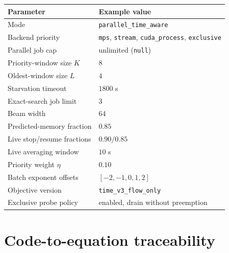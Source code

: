 \documentclass[11pt]{article}
\newcommand{\code}[1]{\textcolor{codeblue}{\texttt{#1}}}
\begin{document}
\begin{center}
\begin{tabular}{@{}ll@{}}
\toprule
Parameter & Example value \\
\midrule
Mode & \code{parallel\_time\_aware} \\
Backend priority & \code{mps}, \code{stream}, \code{cuda\_process}, \code{exclusive} \\
Parallel job cap & unlimited (\code{null}) \\
Priority-window size $K$ & $8$ \\
Oldest-window size $L$ & $4$ \\
Starvation timeout & $1800$ s \\
Exact-search job limit & $3$ \\
Beam width & $64$ \\
Predicted-memory fraction & $0.85$ \\
Live stop/resume fractions & $0.90/0.85$ \\
Live averaging window & $10$ s \\
Priority weight $\eta$ & $0.10$ \\
Batch exponent offsets & $[-2,-1,0,1,2]$ \\
Objective version & \code{time\_v3\_flow\_only} \\
Exclusive probe policy & enabled, drain without preemption \\
\bottomrule
\end{tabular}
\end{center}

\section{Code-to-equation traceability}
\end{document}
